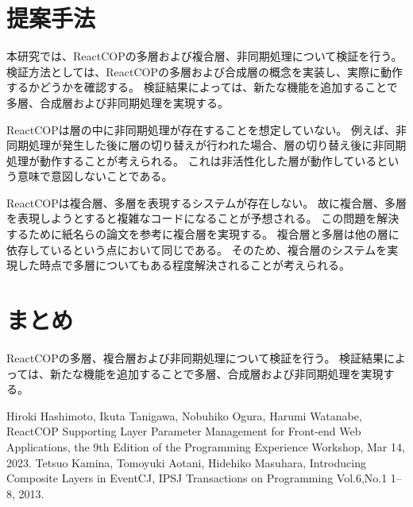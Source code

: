 \documentclass[twocolumn]{jarticle}
\begin{document}
\section{提案手法}
本研究では、ReactCOPの多層および複合層、非同期処理について検証を行う。
検証方法としては、ReactCOPの多層および合成層の概念を実装し、実際に動作するかどうかを確認する。
検証結果によっては、新たな機能を追加することで多層、合成層および非同期処理を実現する。

ReactCOPは層の中に非同期処理が存在することを想定していない。
例えば、非同期処理が発生した後に層の切り替えが行われた場合、層の切り替え後に非同期処理が動作することが考えられる。
これは非活性化した層が動作しているという意味で意図しないことである。

ReactCOPは複合層、多層を表現するシステムが存在しない。
故に複合層、多層を表現しようとすると複雑なコードになることが予想される。
この問題を解決するために紙名らの論文\cite{composite_layer}を参考に複合層を実現する。
複合層と多層は他の層に依存しているという点において同じである。
そのため、複合層のシステムを実現した時点で多層についてもある程度解決されることが考えられる。



\section{まとめ}
ReactCOPの多層、複合層および非同期処理について検証を行う。
検証結果によっては、新たな機能を追加することで多層、合成層および非同期処理を実現する。

\begin{thebibliography}{1}
Hiroki Hashimoto, Ikuta Tanigawa, Nobuhiko Ogura, Harumi Watanabe,
ReactCOP Supporting Layer Parameter Management for Front-end Web Applications,
the 9th Edition of the Programming Experience Workshop, Mar 14, 2023.
Tetsuo Kamina, Tomoyuki Aotani, Hidehiko Masuhara, Introducing Composite Layers in EventCJ, IPSJ Transactions on Programming Vol.6,No.1 1–8, 2013.
\end{thebibliography}
\end{document}
